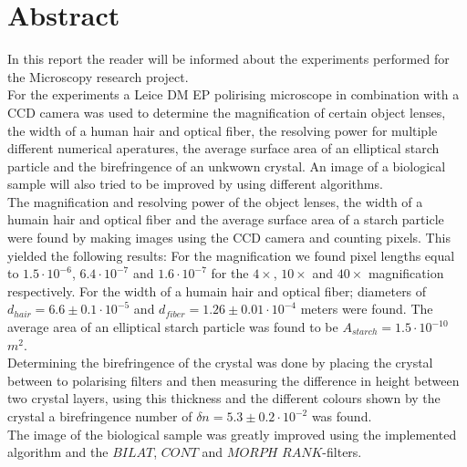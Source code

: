 \section*{Abstract}
In this report the reader will be informed about the experiments performed for the Microscopy research project.\\
For the experiments a Leice DM EP polirising microscope in combination with a CCD camera was used to determine the magnification of certain object lenses, the width of a human hair and optical fiber, the resolving power for multiple different numerical aperatures, the average surface area of an elliptical starch particle and the birefringence of an unkwown crystal. An image of a biological sample will also tried to be improved by using different algorithms.\\
The magnification and resolving power of the object lenses, the width of a humain hair and optical fiber and the average surface area of a starch particle were found by making images using the CCD camera and counting pixels. This yielded the following results: For the magnification we found  pixel lengths equal to $1.5\cdot10^{-6}$, $6.4\cdot10^{-7}$ and $1.6\cdot10^{-7}$ for the $4\times$, $10\times$ and $40\times$ magnification respectively. For the width of a humain hair and optical fiber; diameters of $d_{hair}=6.6\pm0.1\cdot10^{-5}$ and $d_{fiber} = 1.26\pm0.01\cdot10^{-4}$ meters were found. The average area of an elliptical starch particle was found to be $A_{starch}=1.5\cdot10^{-10}$ $m^2$.\\
Determining the birefringence of the crystal was done by placing the crystal between to polarising filters and then measuring the difference in height between two crystal layers, using this thickness and the different colours shown by the crystal a birefringence number of $\delta n = 5.3\pm0.2\cdot10^{-2}$ was found.\\
The image of the biological sample was greatly improved using the implemented algorithm and the $BILAT$, $CONT$ and $MORPH$ $RANK$-filters.\\